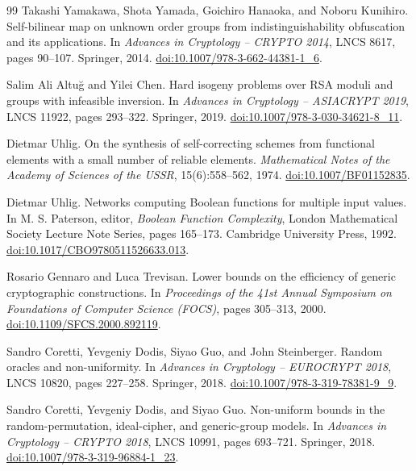 \documentclass[11pt]{article}
\theoremstyle{definition}
\theoremstyle{remark}
\numberwithin{equation}{section}
\begin{document}
\begin{thebibliography}{99}
Takashi Yamakawa, Shota Yamada, Goichiro Hanaoka, and Noboru Kunihiro.
\newblock Self-bilinear map on unknown order groups from indistinguishability
obfuscation and its applications.
\newblock In \emph{Advances in Cryptology -- CRYPTO 2014}, LNCS 8617, pages
90--107. Springer, 2014.
\newblock \href{https://doi.org/10.1007/978-3-662-44381-1_6}{doi:10.1007/978-3-662-44381-1\_6}.

Salim Ali Altu\u{g} and Yilei Chen.
\newblock Hard isogeny problems over {RSA} moduli and groups with infeasible
inversion.
\newblock In \emph{Advances in Cryptology -- ASIACRYPT 2019}, LNCS 11922,
pages 293--322. Springer, 2019.
\newblock \href{https://doi.org/10.1007/978-3-030-34621-8_11}{doi:10.1007/978-3-030-34621-8\_11}.

Dietmar Uhlig.
\newblock On the synthesis of self-correcting schemes from functional
elements with a small number of reliable elements.
\newblock \emph{Mathematical Notes of the Academy of Sciences of the USSR},
15(6):558--562, 1974.
\newblock \href{https://doi.org/10.1007/BF01152835}{doi:10.1007/BF01152835}.

Dietmar Uhlig.
\newblock Networks computing {B}oolean functions for multiple input values.
\newblock In M. S. Paterson, editor, \emph{Boolean Function Complexity},
London Mathematical Society Lecture Note Series, pages 165--173.
Cambridge University Press, 1992.
\newblock \href{https://doi.org/10.1017/CBO9780511526633.013}{doi:10.1017/CBO9780511526633.013}.

Rosario Gennaro and Luca Trevisan.
\newblock Lower bounds on the efficiency of generic cryptographic
constructions.
\newblock In \emph{Proceedings of the 41st Annual Symposium on Foundations
of Computer Science (FOCS)}, pages 305--313, 2000.
\newblock \href{https://doi.org/10.1109/SFCS.2000.892119}{doi:10.1109/SFCS.2000.892119}.

Sandro Coretti, Yevgeniy Dodis, Siyao Guo, and John Steinberger.
\newblock Random oracles and non-uniformity.
\newblock In \emph{Advances in Cryptology -- EUROCRYPT 2018}, LNCS 10820,
pages 227--258. Springer, 2018.
\newblock \href{https://doi.org/10.1007/978-3-319-78381-9_9}{doi:10.1007/978-3-319-78381-9\_9}.

Sandro Coretti, Yevgeniy Dodis, and Siyao Guo.
\newblock Non-uniform bounds in the random-permutation, ideal-cipher, and
generic-group models.
\newblock In \emph{Advances in Cryptology -- CRYPTO 2018}, LNCS 10991,
pages 693--721. Springer, 2018.
\newblock \href{https://doi.org/10.1007/978-3-319-96884-1_23}{doi:10.1007/978-3-319-96884-1\_23}.


\end{thebibliography}
\end{document}
